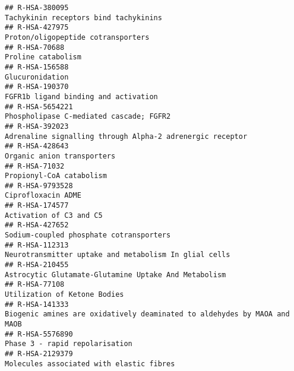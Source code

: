 \documentclass[
]{article}
\begin{document}
\begin{verbatim}
## R-HSA-380095                                                                                                 Tachykinin receptors bind tachykinins
## R-HSA-427975                                                                                                    Proton/oligopeptide cotransporters
## R-HSA-70688                                                                                                                     Proline catabolism
## R-HSA-156588                                                                                                                       Glucuronidation
## R-HSA-190370                                                                                                  FGFR1b ligand binding and activation
## R-HSA-5654221                                                                                              Phospholipase C-mediated cascade; FGFR2
## R-HSA-392023                                                                             Adrenaline signalling through Alpha-2 adrenergic receptor
## R-HSA-428643                                                                                                            Organic anion transporters
## R-HSA-71032                                                                                                               Propionyl-CoA catabolism
## R-HSA-9793528                                                                                                                   Ciprofloxacin ADME
## R-HSA-174577                                                                                                               Activation of C3 and C5
## R-HSA-427652                                                                                               Sodium-coupled phosphate cotransporters
## R-HSA-112313                                                                                 Neurotransmitter uptake and metabolism In glial cells
## R-HSA-210455                                                                                  Astrocytic Glutamate-Glutamine Uptake And Metabolism
## R-HSA-77108                                                                                                           Utilization of Ketone Bodies
## R-HSA-141333                                                              Biogenic amines are oxidatively deaminated to aldehydes by MAOA and MAOB
## R-HSA-5576890                                                                                                       Phase 3 - rapid repolarisation
## R-HSA-2129379                                                                                             Molecules associated with elastic fibres

\end{verbatim}
\end{document}
